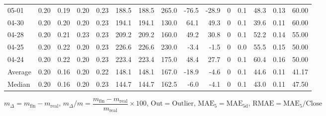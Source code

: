 \begin{threeparttable}
{\begin{tabular}{lrrrrrrrrrrrrrr}
  05-01 &          0.20 &          0.19 &          0.20 &        0.23 &               188.5 &              188.5 &               265.0 &      -76.5 &        -28.9 &              0 &                 0.1 &             48.3 &            0.13 &                  60.00 \\
  04-30 &          0.20 &          0.20 &          0.20 &        0.23 &               194.1 &              194.1 &               130.0 &       64.1 &         49.3 &              0 &                 0.1 &             39.6 &            0.11 &                  60.00 \\
  04-28 &          0.20 &          0.21 &          0.23 &        0.23 &               209.2 &              209.2 &               160.0 &       49.2 &         30.8 &              0 &                 0.1 &             52.2 &            0.14 &                  55.00 \\
  04-25 &          0.20 &          0.22 &          0.20 &        0.23 &               226.6 &              226.6 &               230.0 &       -3.4 &         -1.5 &              0 &                 0.0 &             55.5 &            0.15 &                  50.00 \\
  04-24 &          0.20 &          0.22 &          0.20 &        0.23 &               223.4 &              223.4 &               175.0 &       48.4 &         27.7 &              0 &                 0.1 &             60.4 &            0.16 &                  50.00 \\
Average &          0.20 &          0.16 &          0.20 &        0.22 &               148.1 &              148.1 &               167.0 &      -18.9 &         -4.6 &              0 &                 0.1 &             44.6 &            0.11 &                  41.17 \\
 Median &          0.20 &          0.16 &          0.20 &        0.23 &               144.7 &              144.7 &               162.5 &       -6.0 &         -4.1 &              0 &                 0.1 &             43.0 &            0.11 &                  47.50 \\
\bottomrule
\end{tabular}
}
\begin{tablenotes}\footnotesize
\item $m_\Delta=m_{\text{fin}}-m_{\text{real}}$,
$m_\Delta/m=\dfrac{m_{\text{fin}}-m_{\text{real}}}{m_{\text{real}}}\times100$,
$\mathrm{Out}=\text{Outlier}$,
$\mathrm{MAE}_5=\mathrm{MAE}_{5\text{d}}$,
$\mathrm{RMAE}=\mathrm{MAE}_5/\text{Close}$
\end{tablenotes}
\end{threeparttable}
\endgroup

